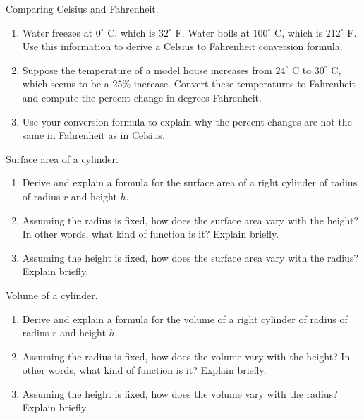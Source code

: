 \begin{prob}
Comparing Celsius and Fahrenheit.  
\begin{enumerate}
\item Water freezes at $0^\circ$ C, which is $32^\circ$ F.  Water boils at $100^\circ$ C, which is $212^\circ$ F.  Use this information to derive a Celsius to Fahrenheit conversion formula.  
\item Suppose the temperature of a model house increases from $24^\circ$ C to $30^\circ$ C, which seems to be a $25\%$ increase.  Convert these temperatures to Fahrenheit and compute the percent change in degrees Fahrenheit. 
\item Use your conversion formula to explain why the percent changes are not the same in Fahrenheit as in Celsius.  
\end{enumerate}
\end{prob}


\begin{prob}
Surface area of a cylinder.
\begin{enumerate}
\item Derive and explain a formula for the surface area of a right cylinder of radius of radius $r$ and height $h$.  
\item Assuming the radius is fixed, how does the surface area vary with the height?  In other words, what kind of function is it?  Explain briefly.  
\item Assuming the height is fixed, how does the surface area vary with the radius?  Explain briefly. 
\end{enumerate}
\end{prob}

\begin{prob}
Volume of a cylinder.
\begin{enumerate}
\item Derive and explain a formula for the volume of a right cylinder of radius of radius $r$ and height $h$.  
\item Assuming the radius is fixed, how does the volume vary with the height?  In other words, what kind of function is it?  Explain briefly.  
\item Assuming the height is fixed, how does the volume vary with the radius?  Explain briefly. 
\end{enumerate}
\end{prob}



